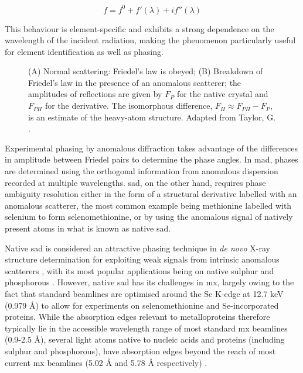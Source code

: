 \begin{equation}
    f=f^0+f'(\lambda)+if''(\lambda) \label{total scattering}
\end{equation}

This behaviour is element-specific and exhibits a strong dependence on the wavelength of the incident radiation, making the phenomenon particularly useful for element identification as well as phasing.

\begin{figure}
    \centering
    
    \caption{(A) Normal scattering: Friedel's law is obeyed; (B) Breakdown of Friedel's law in the presence of an anomalous scatterer; the amplitudes of reflections are given by $F_P$ for the native crystal and $F_{PH}$ for the derivative. The isomorphous difference, $F_H \approx F_{PH} - F_P$, is an estimate of the heavy-atom structure. Adapted from Taylor, G. \cite{Taylor2003}.}
    \label{Breakdown of Friedel's law}
\end{figure}

Experimental phasing by anomalous diffraction takes advantage of the differences in amplitude between Friedel pairs to determine the phase angles. In \ac{mad}, phases are determined using the orthogonal information from anomalous dispersion recorded at multiple wavelengths. \Ac{sad}, on the other hand, requires phase ambiguity resolution either in the form of a structural derivative labelled with an anomalous scatterer, the most common example being methionine labelled with selenium to form selenomethionine, or by using the anomalous signal of natively present atoms in what is known as native \ac{sad}.

Native \ac{sad} is considered an attractive phasing technique in  \textit{de novo} X-ray structure determination %
for exploiting weak signals from intrinsic anomalous scatterers \cite{Basu2019}, with its most popular applications being on native sulphur and phosphorous \cite{Karasawa2022}. However, native \ac{sad} has its challenges in \ac{mx}, largely owing to the fact that standard beamlines are optimised around the Se K-edge at 12.7 \unit{keV} (0.979 Å) to allow for experiments on selenomethionine and Se-incorporated proteins.
While the absorption edges relevant to metalloproteins therefore typically lie in the accessible wavelength range of most standard \ac{mx} beamlines (0.9-2.5 Å), several light atoms native to nucleic acids and proteins (including sulphur and phosphorous), have absorption edges beyond the reach of most current \ac{mx} beamlines (5.02 Å and 5.78 Å respectively) \cite{Olieric2016}. 

